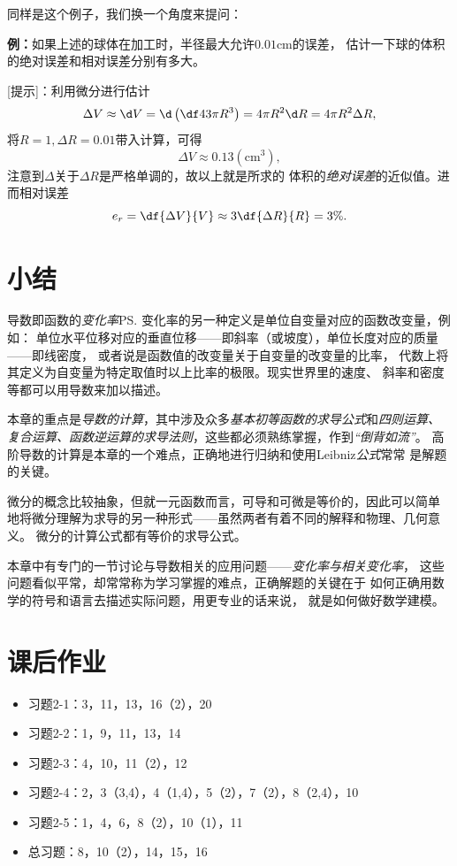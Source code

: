 同样是这个例子，我们换一个角度来提问：

{\bf 例：}如果上述的球体在加工时，半径最大允许$0.01$cm的误差，
估计一下球的体积的绝对误差和相对误差分别有多大。

[提示]：利用微分进行估计
$$\Delta V\approx \d V=\d\left(\df43\pi R^3\right)
=4\pi R^2\d R=4\pi R^2\Delta R,$$
将$R=1,\Delta R=0.01$带入计算，可得
$$\Delta V\approx 0.13(\mbox{cm}^3),$$
注意到$\Delta$关于$\Delta R$是严格单调的，故以上就是所求的
体积的{\it 绝对误差}的近似值。进而相对误差
$$e_r=\df{\Delta V}{V}\approx 3\df{\Delta R}{R}=3\%.$$

\section{小结}

导数即函数的{\it 变化率}\ps{变化率的另一种定义是单位自变量对应的函数改变量，例如：
单位水平位移对应的垂直位移——即斜率（或坡度），单位长度对应的质量——即线密度}，
或者说是函数值的改变量关于自变量的改变量的比率，
代数上将其定义为自变量为特定取值时以上比率的极限。现实世界里的速度、
斜率和密度等都可以用导数来加以描述。

本章的重点是{\it 导数的计算}，其中涉及众多{\it 基本初等函数的求导公式}和{\it 四则运算、
复合运算、函数逆运算的求导法则}，这些都必须熟练掌握，作到{\it “倒背如流”}。
高阶导数的计算是本章的一个难点，正确地进行归纳和使用Leibniz{\it 公式}常常
是解题的关键。

微分的概念比较抽象，但就一元函数而言，可导和可微是等价的，因此可以简单
地将微分理解为求导的另一种形式——虽然两者有着不同的解释和物理、几何意义。
微分的计算公式都有等价的求导公式。

本章中有专门的一节讨论与导数相关的应用问题——{\it 变化率与相关变化率}，
这些问题看似平常，却常常称为学习掌握的难点，正确解题的关键在于
如何正确用数学的符号和语言去描述实际问题，用更专业的话来说，
就是如何做好数学建模。

\newpage

\section*{课后作业}

\begin{itemize}
  \item 习题2-1：3，11，13，16（2），20
  \item 习题2-2：1，9，11，13，14
  \item 习题2-3：4，10，11（2），12
  \item 习题2-4：2，3（3,4），4（1,4），5（2），7（2），8（2,4），10
  \item 习题2-5：1，4，6，8（2），10（1），11
  \item 总习题：8，10（2），14，15，16
\end{itemize}